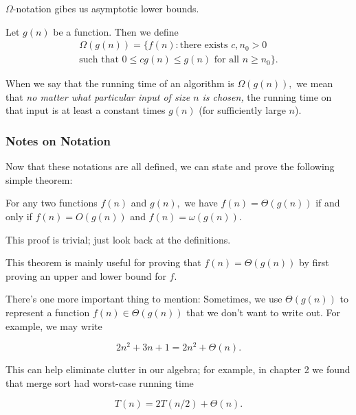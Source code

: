 \documentclass{article}
\begin{document}
$\Omega$-notation gibes us asymptotic lower bounds.

\begin{tcolorbox}[title=$\omega$-notation]
	Let $g(n)$ be a function. Then we define
	\begin{multline*}
	\Omega(g(n)) = \{ f(n) : \text{there exists } c, n_0 > 0 \\ \text{such that } 0 \leq cg(n) \leq g(n) \text{ for all } n \geq n_0 \}.
	\end{multline*}
\end{tcolorbox}

\vspace{2mm}

When we say that the running time of an algorithm is $\Omega(g(n)),$ we mean that \textit{no matter what particular input of size $n$ is chosen,} the running time on that input is at least a constant times $g(n)$ (for sufficiently large $n$). 

\subsubsection{Notes on Notation}

Now that these notations are all defined, we can state and prove the following simple theorem:

\begin{tcolorbox}[title=Theorem 3.1]
For any two functions $f(n)$ and $g(n),$ we have $f(n) = \Theta(g(n))$ if and only if $f(n) = O(g(n))$ and $f(n) = \omega(g(n)).$
\end{tcolorbox}

\vspace{2mm}

This proof is trivial; just look back at the definitions.

This theorem is mainly useful for proving that $f(n) = \Theta(g(n))$ by first proving an upper and lower bound for $f.$

\vspace{5mm}

There's one more important thing to mention: Sometimes, we use $\Theta(g(n))$ to represent a function $f(n) \in \Theta(g(n))$ that we don't want to write out. For example, we may write

$$2n^2 + 3n + 1 = 2n^2 + \Theta(n).$$

This can help eliminate clutter in our algebra; for example, in chapter 2 we found that merge sort had worst-case running time

$$T(n) = 2T(n/2) + \Theta(n).$$
\end{document}
